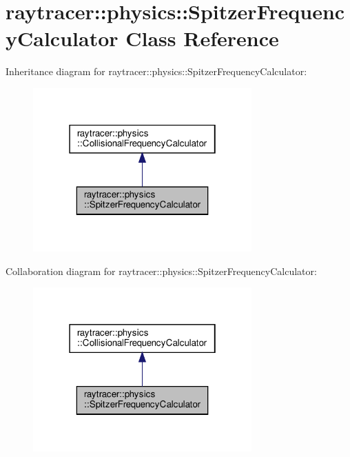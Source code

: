 \hypertarget{classraytracer_1_1physics_1_1SpitzerFrequencyCalculator}{}\section{raytracer\+:\+:physics\+:\+:Spitzer\+Frequency\+Calculator Class Reference}
\label{classraytracer_1_1physics_1_1SpitzerFrequencyCalculator}


Inheritance diagram for raytracer\+:\+:physics\+:\+:Spitzer\+Frequency\+Calculator\+:
\nopagebreak
\begin{figure}[H]
\begin{center}
\leavevmode
\includegraphics[width=238pt]{classraytracer_1_1physics_1_1SpitzerFrequencyCalculator__inherit__graph}
\end{center}
\end{figure}


Collaboration diagram for raytracer\+:\+:physics\+:\+:Spitzer\+Frequency\+Calculator\+:
\nopagebreak
\begin{figure}[H]
\begin{center}
\leavevmode
\includegraphics[width=238pt]{classraytracer_1_1physics_1_1SpitzerFrequencyCalculator__coll__graph}
\end{center}
\end{figure}

